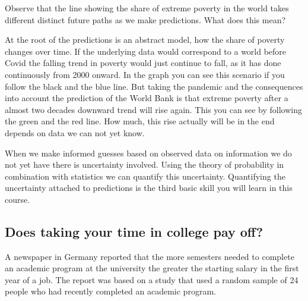 \documentclass[
  letterpaper,
]{scrbook}
\begin{document}
Observe that the line showing the share of extreme poverty in the world
takes different distinct future paths as we make predictions. What does
this mean?

At the root of the predictions is an abstract model, how the share of poverty changes over time. If the
underlying data would correspond to a world before Covid the falling
trend in poverty would just continue to fall, as it has done
continuously from 2000 onward. In the graph you can see this scenario if
you follow the black and the blue line. But taking the pandemic and the
consequences into account the prediction of the World Bank is that
extreme poverty after a almost two decades downward trend will rise
again. This you can see by following the green and the red line. How
much, this rise actually will be in the end depends on data we can not
yet know.

When we make informed guesses based on observed data on information we
do not yet have there is uncertainty involved. Using the theory of
probability in combination with statistics we can quantify this
uncertainty. Quantifying the uncertainty attached to predictions is the
third basic skill you will learn in this course.

\hypertarget{does-taking-your-time-in-college-pay-off}{%
\subsection{Does taking your time in college pay
off?}\label{does-taking-your-time-in-college-pay-off}}

A newspaper in Germany reported that the more semesters needed to
complete an academic program at the university the greater the starting
salary in the first year of a job. The report was based on a study that
used a random sample of 24 people who had recently
completed an academic program.
\end{document}
